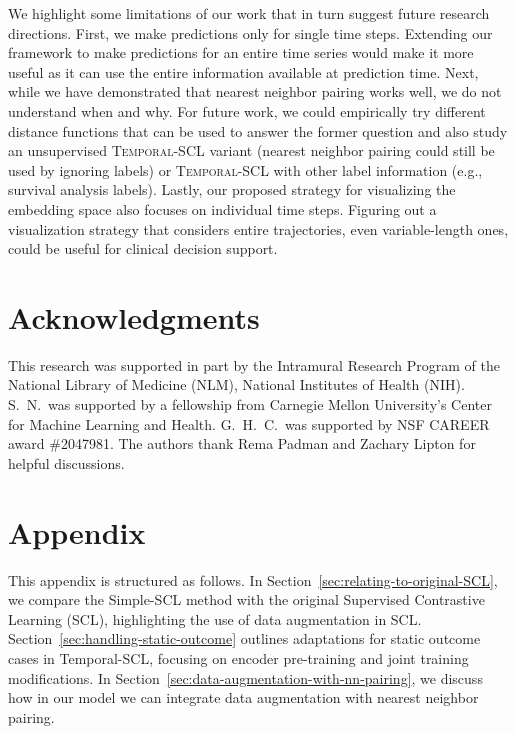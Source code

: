 \documentclass[pmlr,twocolumn,10pt]{jmlr} %
\begin{document}
We highlight some limitations of our work that in turn suggest future research directions. First, we make predictions only for single time steps. Extending our framework to make predictions for an entire time series would make it more useful as it can use the entire information available at prediction time. Next, while we have demonstrated that nearest neighbor pairing works well, we do not understand when and why. For future work, we could empirically try different distance functions that can be used to answer the former question and also study an unsupervised \textsc{Temporal-SCL} variant (nearest neighbor pairing could still be used by ignoring labels) or \textsc{Temporal-SCL} with other label information (e.g., survival analysis labels). Lastly, our proposed strategy for visualizing the embedding space also focuses on individual time steps. Figuring out a visualization strategy that considers entire trajectories, even variable-length ones, could be useful for clinical decision support.

\vspace{-1.25em}
\section*{Acknowledgments}
\vspace{-.25em}
This research was supported in part by the Intramural Research Program of the National Library of Medicine (NLM), National Institutes of Health (NIH). %
S.~N.~was supported by a fellowship from Carnegie Mellon University's Center for Machine Learning and Health. G.~H.~C.~was supported by NSF CAREER award \#2047981. The authors thank Rema Padman and Zachary Lipton for helpful discussions.



\newpage
\appendix
\section{Appendix}\label{apd:first}
This appendix is structured as follows. 
In Section~\ref{sec:relating-to-original-SCL}, we compare the Simple-SCL method with the original Supervised Contrastive Learning (SCL), highlighting the use of data augmentation in SCL. Section~\ref{sec:handling-static-outcome} outlines adaptations for static outcome cases in Temporal-SCL, focusing on encoder pre-training and joint training modifications. In Section~\ref{sec:data-augmentation-with-nn-pairing}, we discuss how in our model we can integrate data augmentation with nearest neighbor pairing. 
\end{document}
